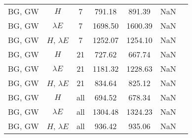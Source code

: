 \begin{tabular}{|c|c|c|c|c|c|c|}
BG, GW & $H$ & 7 & 791.18 & 891.39 & NaN \\
BG, GW & $\lambda E$ & 7 & 1698.50 & 1600.39 & NaN \\
BG, GW & $H$, $\lambda E$ & 7 & 1252.07 & 1254.10 & NaN \\
BG, GW & $H$ & 21 & 727.62 & 667.74 & NaN \\
BG, GW & $\lambda E$ & 21 & 1181.32 & 1228.63 & NaN \\
BG, GW & $H$, $\lambda E$ & 21 & 834.64 & 825.12 & NaN \\
BG, GW & $H$ & all & 694.52 & 678.34 & NaN \\
BG, GW & $\lambda E$ & all & 1304.48 & 1324.23 & NaN \\
BG, GW & $H$, $\lambda E$ & all & 936.42 & 935.06 & NaN \\
\bottomrule
\end{tabular}

